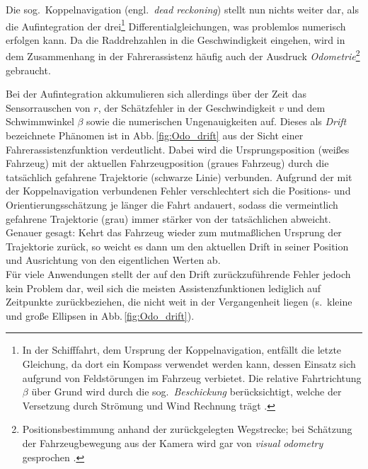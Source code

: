Die sog.\ Koppelnavigation (engl.\ \emph{dead reckoning}) stellt nun nichts weiter dar, als die Aufintegration der drei\footnote{In der Schifffahrt, dem Ursprung der Koppelnavigation, entfällt die letzte Gleichung, da dort ein Kompass verwendet werden kann, dessen Einsatz sich aufgrund von Feldstörungen im Fahrzeug verbietet. Die relative Fahrtrichtung $\beta$ über Grund wird durch die sog.\ \emph{Beschickung} berücksichtigt, welche der Versetzung durch Strömung und Wind Rechnung trägt \cite{dreyer_sks}.} Differentialgleichungen, was problemlos numerisch erfolgen kann. Da die Raddrehzahlen in die Geschwindigkeit eingehen, wird in dem Zusammenhang in der Fahrerassistenz häufig auch der Ausdruck \emph{Odometrie}\footnote{Positionsbestimmung anhand der zurückgelegten Wegstrecke; bei Schätzung der Fahrzeugbewegung aus der Kamera wird gar von \emph{visual odometry} gesprochen \cite{lategahn2012motion}.} gebraucht.

Bei der Aufintegration akkumulieren sich allerdings über der Zeit das Sensorrauschen von $r$, der Schätzfehler in der Geschwindigkeit $v$ und dem Schwimmwinkel $\beta$ sowie die numerischen Ungenauigkeiten auf. Dieses als \emph{Drift} bezeichnete Phänomen ist in Abb.\,\ref{fig:Odo_drift} aus der Sicht einer Fahrerassistenzfunktion verdeutlicht. Dabei wird die Ursprungsposition (weißes Fahrzeug) mit der aktuellen Fahrzeugposition (graues Fahrzeug) durch die tatsächlich gefahrene Trajektorie (schwarze Linie) verbunden. Aufgrund der mit der Koppelnavigation verbundenen Fehler verschlechtert sich die Positions- und Orientierungsschätzung je länger die Fahrt andauert, sodass die vermeintlich gefahrene Trajektorie (grau) immer stärker von der tatsächlichen abweicht. Genauer gesagt: Kehrt das Fahrzeug wieder zum mutmaßlichen Ursprung der Trajektorie zurück, so weicht es dann um den aktuellen Drift in seiner Position und Ausrichtung von den eigentlichen Werten ab. \\
Für viele Anwendungen stellt der auf den Drift zurückzuführende Fehler jedoch kein Problem dar, weil sich die meisten Assistenzfunktionen lediglich auf Zeitpunkte zurückbeziehen, die nicht weit in der Vergangenheit liegen (s.\ kleine und große Ellipsen in Abb.\,\ref{fig:Odo_drift}).

